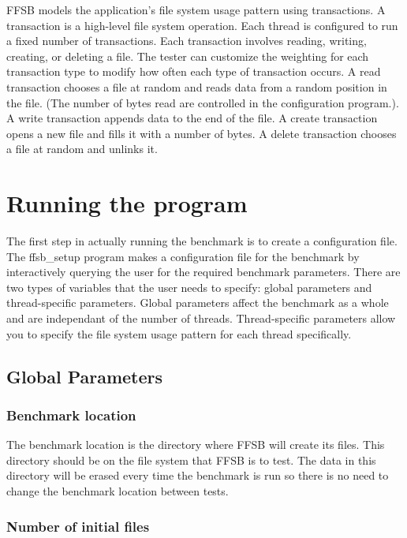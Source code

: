 \documentclass[twocolumn]{article}
\begin{document}
FFSB models the application's file system usage pattern using
transactions.  A transaction is a high-level file system operation.
Each thread is configured to run a fixed number of transactions.  Each
transaction involves reading, writing, creating, or deleting a file.
The tester can customize the weighting for each transaction type to
modify how often each type of transaction occurs. A read transaction
chooses a file at random and reads data from a random position in the
file.  (The number of bytes read are controlled in the configuration
program.).  A write transaction appends data to the end of the file.
A create transaction opens a new file and fills it with a number of
bytes.  A delete transaction chooses a file at random and unlinks it.

\section{Running the program}

The first step in actually running the benchmark is to create a
configuration file.  The ffsb_setup program makes a configuration file
for the benchmark by interactively querying the user for the required
benchmark parameters.  There are two types of variables that the user
needs to specify: global parameters and thread-specific parameters.
Global parameters affect the benchmark as a whole and are independant
of the number of threads.  Thread-specific parameters allow you to
specify the file system usage pattern for each thread specifically.

\subsection{Global Parameters}
\subsubsection{Benchmark location}

The benchmark location is the directory where FFSB will create its
files.  This directory should be on the file system that FFSB is to
test.  The data in this directory will be erased every time the
benchmark is run so there is no need to change the benchmark location
between tests.

\subsubsection{Number of initial files}
\end{document}
